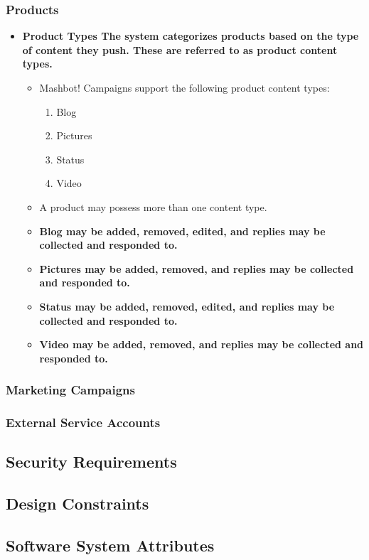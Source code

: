 \documentclass{article}
\begin{document}
		\subsubsection{Products}
			\begin{itemize}
				\item \bf{Product Types} The system categorizes products based on the type of content they push.
			 		These are referred to as product content types.
				\begin{itemize}
					\item Mashbot! Campaigns support the following product content types:
						\begin{enumerate}
							\item Blog
							\item Pictures
							\item Status
							\item Video
						\end{enumerate}
					\item A product may possess more than one content type.
					\item \bf{Blog} may be added, removed, edited, and replies may be collected and responded to. 
					\item \bf{Pictures} may be added, removed, and replies may be collected and responded to.
					\item \bf{Status} may be added, removed, edited, and replies may be collected and responded to. 
					\item \bf{Video} may be added, removed, and replies may be collected and responded to.
				\end{itemize}	
			\end{itemize}
		\subsubsection{Marketing Campaigns}
		\subsubsection{External Service Accounts}

	\subsection{Security Requirements}
	\subsection{Design Constraints}
	\subsection{Software System Attributes}
\end{document}
